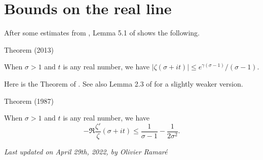 \par 
\section{Bounds on the real line}


After some estimates
from \cite{Bastion-Rogalaski*02}, 
Lemma 5.1 of \cite{Ramare*13d} shows
the following.
\par 
\begin{thm}{Theorem (2013)}

  When $\sigma> 1$ and $t$ is any real number, we have $|\zeta(\sigma+it)|\le   e^{\gamma(\sigma-1) }/(\sigma-1)$.
\end{thm}


Here is the Theorem of
\cite{Delange*87}.
See also Lemma 2.3 of
\cite{Ford*01} for a
slightly weaker version.
\par 
\begin{thm}{Theorem (1987)}

  When $\sigma> 1$ and $t$ is any real number, we have
  $$
  -\Re\frac{\zeta'}{\zeta}(\sigma+it)\le
  \frac{1}{\sigma-1}-\frac{1}{2\sigma^2}.
  $$ 
\end{thm}








  
\begin{flushright}\small\sl{}   Last updated on April 29th, 2022, by Olivier Ramar\'e
 \end{flushright}















